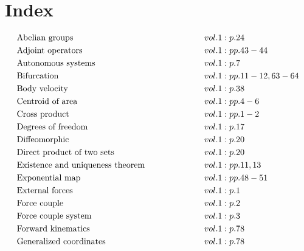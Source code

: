 \documentclass[a4paper]{article}
\begin{document}
 
\section*{Index} 
\allowdisplaybreaks 
\begin{align*} 
&\text{Abelian groups} \hspace*{6em}&& vol. 1: p. 24\\
&\text{Adjoint operators} \hspace*{6em}&& vol. 1: pp. 43-44\\
&\text{Autonomous systems} \hspace*{6em}&& vol. 1: p. 7\\
&\text{Bifurcation} \hspace*{6em}&& vol. 1: pp. 11-12, 63-64\\
&\text{Body velocity} \hspace*{6em}&& vol. 1: p. 38\\
&\text{Centroid of area} \hspace*{6em}&& vol. 1: pp. 4-6\\
&\text{Cross product} \hspace*{6em}&& vol. 1: pp. 1-2\\
&\text{Degrees of freedom} \hspace*{6em}&& vol. 1: p. 17\\
&\text{Diffeomorphic} \hspace*{6em}&& vol. 1: p. 20\\
&\text{Direct product of two sets} \hspace*{6em}&& vol. 1: p. 20\\
&\text{Existence and uniqueness theorem} \hspace*{6em}&& vol. 1: pp. 11, 13\\
&\text{Exponential map} \hspace*{6em}&& vol. 1: pp. 48-51\\
&\text{External forces} \hspace*{6em}&& vol. 1: p. 1\\
&\text{Force couple} \hspace*{6em}&& vol. 1: p. 2\\
&\text{Force couple system} \hspace*{6em}&& vol. 1: p. 3\\
&\text{Forward kinematics} \hspace*{6em}&& vol. 1: p. 78\\
&\text{Generalized coordinates} \hspace*{6em}&& vol. 1: p. 78\\

\end{align*}
\end{document}
